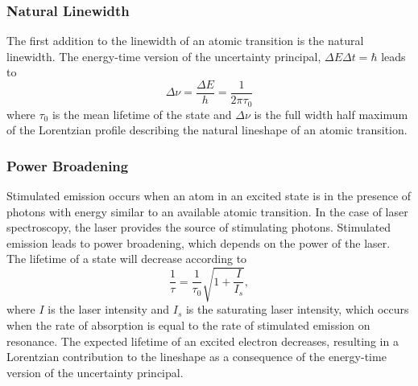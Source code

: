 \noindent \subsubsection{Natural Linewidth}
\noindent The first addition to the linewidth of an atomic transition is the natural linewidth. The energy-time version of the uncertainty principal, $\Delta E \Delta t= \hbar$ leads to 
\begin{equation}
\Delta \nu = \frac{\Delta E}{h}=\frac{1}{2 \pi \tau_0}
\end{equation}
where $\tau_0$ is the mean lifetime of the state and $\Delta \nu$ is the full width half maximum of the Lorentzian profile describing the natural lineshape of an atomic transition\cite{TomT}.

\noindent \subsubsection{Power Broadening}
Stimulated emission occurs when an atom in an excited state is in the presence of photons with energy similar to an available atomic transition. In the case of laser spectroscopy, the laser provides the source of stimulating photons. Stimulated emission leads to power broadening, which depends on the power of the laser. The lifetime of a state will decrease according to
\begin{equation}
\frac{1}{\tau}= \frac{1}{\tau_0}\sqrt{1+\frac{I}{I_s}},
\end{equation}
where $I$ is the laser intensity and $I_s$ is the saturating laser intensity, which occurs when the rate of absorption is equal to the rate of stimulated emission on resonance. The expected lifetime of an excited electron decreases, resulting in a Lorentzian contribution to the lineshape as a consequence of the energy-time version of the uncertainty principal\cite{TomT}.

